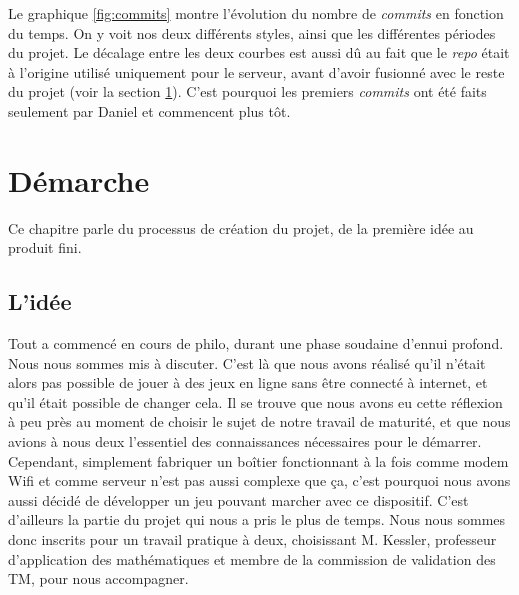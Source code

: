 \documentclass[a4paper]{article}
\begin{document}
\noindent Le graphique \ref{fig:commits} montre  l'évolution du nombre de \textit{commits} en fonction du temps. On y voit nos deux différents styles, ainsi que les différentes périodes du projet. Le décalage entre les deux courbes est aussi dû au fait que le \textit{repo} était à l’origine utilisé uniquement pour le serveur, avant d’avoir fusionné avec le reste du projet (voir la section \ref{section:demarche}). C’est pourquoi les premiers \textit{commits} ont été faits seulement par Daniel et commencent plus tôt.



\section{Démarche}
\label{section:demarche}
Ce chapitre parle du processus de création du projet, de la première idée au produit fini. 
\subsection{L’idée}
Tout a commencé en cours de philo, durant une phase soudaine d'ennui profond. Nous nous sommes mis à discuter. C'est là que nous avons réalisé qu'il n’était alors pas possible de jouer à des jeux en ligne sans être connecté à internet, et qu'il était possible de changer cela. Il se trouve que nous avons eu cette réflexion à peu près au moment de choisir le sujet de notre travail de maturité, et que nous avions à nous deux l’essentiel des connaissances nécessaires pour le démarrer. Cependant, simplement fabriquer un boîtier fonctionnant à la fois comme modem Wifi et comme serveur n’est pas aussi complexe que ça, c’est pourquoi nous avons aussi décidé de développer un jeu pouvant marcher avec ce dispositif. C’est d’ailleurs la partie du projet qui nous a pris le plus de temps.
Nous nous sommes donc inscrits pour un travail pratique à deux, choisissant M. Kessler, professeur d’application des mathématiques et membre de la commission de validation des TM, pour nous accompagner. %
\end{document}
